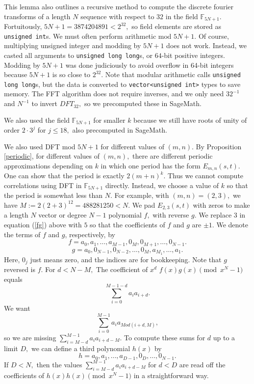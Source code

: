 \documentclass[11pt]{amsart} %
\begin{document}
This lemma also outlines a recursive method to compute the discrete fourier transforms of a length $N$ sequence with respect to $32$ in the field $\mathbb{F}_{5N+1}.$ Fortuitously, $5N+1 = 3874204891 < 2^{32},$ so field elements are stored as \texttt{unsigned int}s. We must often perform arithmetic $\text{mod } 5N+1.$ Of course, multiplying unsigned integer and modding by $5N+1$ does not work. Instead, we casted all arguments to \texttt{unsigned long long}s, or $64$-bit positive integers. Modding by $5N+1$ was done judiciously to avoid overflow in 64-bit integers because $5N+1$ is so close to $2^{32}.$ Note that modular arithmetic calls \texttt{unsigned long long}s, but the data is converted to \texttt{vector<unsigned int>} types to save memory. The FFT algorithm does not require inverses, and we only need $32^{-1}$ and $N^{-1}$ to invert $DFT_{32},$ so we precomputed these in SageMath. 

We also used the field $\mathbb{F}_{5N+1}$ for smaller $k$ because we still have roots of unity of order $2 \cdot 3^j$ for $j \le 18,$ also precomputed in SageMath.


We also used DFT mod $5N+1$ for different values of $(m,n).$ By Proposition \ref{periodic}, for different values of $(m,n),$ there are different periodic approximations depending on $k$ in which one period has the form $E_{m, n}(s, t).$ One can show that the period is exactly $2(m+n)^k.$ Thus we cannot compute correlations using DFT in $\mathbb{F}_{5N+1}$ directly. Instead, we choose a value of $k$ so that the period is somewhat less than $N.$ For example, with $(m,n) = (2,3),$ we have $M:= 2(2+3)^{12} = 488281250 < N.$ We pad $E_{2,3}(s,t)$ with zeros to make a length $N$ vector or degree $N-1$ polynomial $f,$ with reverse $g$. We replace $3$ in equation (\ref{fg}) above with $5$ so that the coefficients of $f$ and $g$ are $\pm 1.$ We denote the terms of $f$ and $g$, respectively,  by
\[f = a_0, a_1, \ldots, a_{M-1}, 0_M, 0_{M+1}, \ldots, 0_{N-1}.\]
\[g = a_0, 0_{N-1}, 0_{N-2}, \ldots, 0_{M}, a_{M_1}, \ldots, a_1.\]
Here, $0_j$ just means zero, and the indices are for bookkeeping. Note that $g$ reversed is $f.$ For $d < N - M,$ The coefficient of $x^d$ $f(x) g(x) \pmod{x^N-1}$ equals 
\[ \sum_{i=0}^{M-1-d} a_i a_{i+d}.\]
We want
\[ \sum_{i=0}^{M-1} a_i a_{Mod(i+d, M)},\]
so we are missing $\sum_{i=M-d}^{M-1} a_i a_{i+d-M}.$ To compute these sums for $d$ up to a limit $D,$ we can define a third polynomial $h(x)$ by
\[ h = a_0, a_1, \ldots, a_{D-1}, 0_D, \ldots, 0_{N-1}.\]
If $D < N,$ then the values $\sum_{i = M-d}^{M-1} a_i a_{i+d-M}$ for $d < D$ are read off the coefficients of $h(x) h(x) \pmod{x^N-1}$ in a straightforward way.
\end{document}
